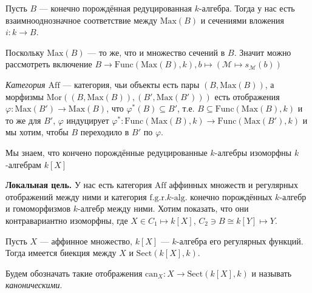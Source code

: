 \documentclass[12pt,a4paper]{article}
\newcommand{\Max}{\mathrm{Max}}
\newcommand{\Func}{\mathrm{Func}}
\newcommand{\Aff}{\mathrm{Aff}}
\newcommand{\Mor}{\mathrm{Mor}}
\newcommand{\Sect}{\mathrm{Sect}}
\newcommand{\can}{\mathrm{can}}
\newcommand{\fgrkalg}[1][k]{\text{f.g.r.$#1$-alg.}}
\begin{document}
    \begin{remark}
        Пусть $B$ --- конечно порождённая редуцированная $k$-алгебра. Тогда у нас есть взаимнооднозначное соответствие между $\Max(B)$ и сечениями вложения $i: k \to B$.

    \end{remark}

    \begin{remark}
        Поскольку $\Max(B)$ --- то же, что и множество сечений в $B$. Значит можно рассмотреть включение $B \to \Func(\Max(B), k), b \mapsto (\mathcal{M} \mapsto s_{\mathcal{M}}(b))$
    \end{remark}

    \begin{definition}
        \emph{Категория $\Aff$} --- категория, чьи объекты есть пары $(B, \Max(B))$, а морфизмы $\Mor((B, \Max(B)), (B', \Max(B')))$ есть отображения $\varphi: \Max(B') \to \Max(B)$, что $\varphi^*(B) \subseteq B'$, т.е. $B \subseteq \Func(\Max(B), k)$ и то же для $B'$, $\varphi$ индуцирует $\varphi^*: \Func(\Max(B), k) \to \Func(\Max(B'), k)$ и мы хотим, чтобы $B$ переходило в $B'$ по $\varphi$.
    \end{definition}

    \begin{remark}
        Мы знаем, что кончено порождённые редуцированные $k$-алгебры изоморфны $k$-алгебрам $k[X]$

        \textbf{Локальная цель.} У нас есть категория $\Aff$ аффинных множеств и регулярных отображений между ними и категория $\fgrkalg$ конечно порождённых $k$-алгебр и гомоморфизмов $k$-алгебр между ними. Хотим показать, что они контравариантно изоморфны, где $X \in C_1 \mapsto k[X]$, $C_2 \ni B \cong k[Y] \mapsto Y$.
    \end{remark}

    \begin{lemma}
        Пусть $X$ --- аффинное множество, $k[X]$ --- $k$-алгебра его регулярных функций. Тогда имеется биекция между $X$ и $\Sect(k[X], k)$.
    \end{lemma}

    \begin{definition}
        Будем обозначать такие отображения $\can_X: X \to \Sect(k[X], k)$ и называть \emph{каноническими}.
    \end{definition}
    
\end{document}
